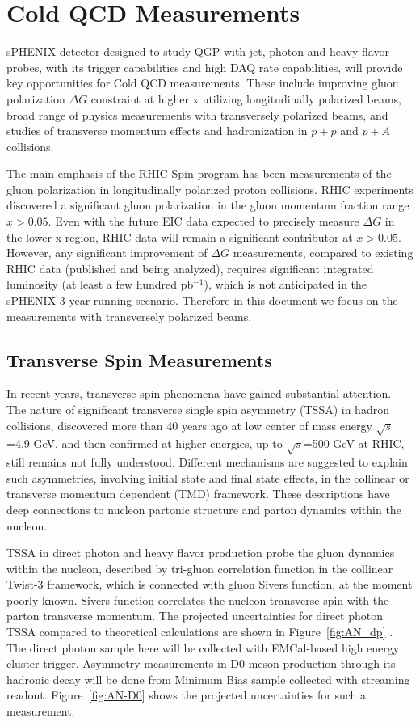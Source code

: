 \section{Cold QCD Measurements}
\label{sec:ColdQCD}

sPHENIX detector designed to study QGP with jet, photon and heavy flavor probes, with its trigger capabilities and high DAQ rate capabilities, will provide key opportunities for Cold QCD measurements. These include improving gluon polarization $\Delta G$ constraint at higher x utilizing longitudinally polarized beams, broad range of physics measurements with transversely polarized beams, and studies of transverse momentum effects and hadronization in $p+p$ and $p+A$ collisions.

The main emphasis of the RHIC Spin program has been measurements of the gluon polarization in longitudinally polarized proton collisions. RHIC experiments discovered a significant gluon polarization in the gluon momentum fraction range $x>0.05$. Even with the future EIC data expected to precisely measure $\Delta G$ in the lower x region, RHIC data will remain a significant contributor at $x>0.05$. However, any significant improvement of $\Delta G$ measurements, compared to existing RHIC data (published and being analyzed), requires significant integrated luminosity (at least a few hundred pb$^{-1}$), which is not anticipated in the sPHENIX 3-year running scenario. Therefore in this document we focus on the measurements with transversely polarized beams.

\subsection {Transverse Spin Measurements}

In recent years, transverse spin phenomena have gained substantial attention. The nature of significant transverse single spin asymmetry (TSSA) in hadron collisions, discovered more than 40 years ago at low center of mass energy $\sqrt{s}$=4.9 GeV, and then confirmed at higher energies, up to $\sqrt{s}$=500 GeV at RHIC, still remains not fully understood. Different mechanisms are suggested to explain such asymmetries, involving initial state and final state effects, in the collinear or transverse momentum dependent (TMD) framework. These descriptions have deep connections to nucleon partonic structure and parton dynamics within the nucleon.

TSSA in direct photon and heavy flavor production probe the gluon dynamics within the nucleon, described by tri-gluon correlation function in the collinear Twist-3 framework, which is connected with gluon Sivers function, at the moment poorly known. Sivers function correlates the nucleon transverse spin with the parton transverse
momentum. The projected uncertainties for direct photon TSSA compared to theoretical calculations are shown in Figure~\ref{fig:AN_dp} . The direct photon sample here will be collected with EMCal-based high energy cluster trigger. Asymmetry measurements in D0 meson production through its hadronic decay will be done from Minimum Bias sample collected with streaming readout. Figure~\ref{fig:AN-D0} shows the projected uncertainties for such a measurement.

